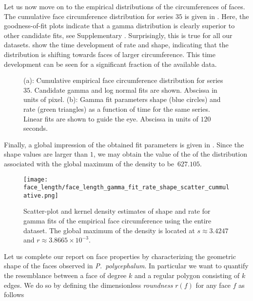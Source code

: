 		Let us now move on to the empirical distributions of the circumferences of faces. The cumulative face circumference distribution for series $35$ is given in . Here, the goodness-of-fit plots indicate  that a gamma distribution is clearly superior to other candidate fits, see Supplementary . Surprisingly, this is true for all our datasets.  show the time development of rate and shape, indicating that the distribution is shifting towards faces of larger circumference. This time development can be seen for a significant fraction of the available data.

		\begin{figure}
			\centering

			\caption[Face circumference distribution.]{(a): Cumulative empirical face circumference distribution for series $35$. Candidate gamma and log normal fits are shown. Abscissa in units of pixel. (b): Gamma fit parameters shape (blue circles) and rate (green triangles) as a function of time for the same series. Linear fits are shown to guide the eye. Abscissa in units of $120$ seconds.}
			\label{fig:face_length_fit}
		\end{figure}

		Finally, a global impression of the obtained fit parameters is given in . Since the shape values are larger than $1$, we may obtain the value of the of the distribution associated with the global maximum of the density to be~$627.105$.

		\begin{figure}[!htbp]
			\centering
				\texttt{[image: face\_length/face\_length\_gamma\_fit\_rate\_shape\_scatter\_cummulative.png]}
			\caption[Face circumference fit parameter densities.]{Scatter-plot and kernel density estimates of shape and rate for gamma fits of the empirical face circumference using the entire dataset. The global maximum of the density is located at $s \approx 3.4247$ and $r \approx 3.8665 \times 10^{-3}$.}
			\label{fig:face_length_kde}
		\end{figure}

		Let us complete our report on face properties by characterizing the geometric shape of the faces observed in \emph{P.~polycephalum}. In particular we want to quantify the resemblance between a face of degree $k$ and a regular polygon consisting of $k$ edges. We do so by defining the dimensionless \emph{roundness} $r(f)$ for any face $f$ as follows

